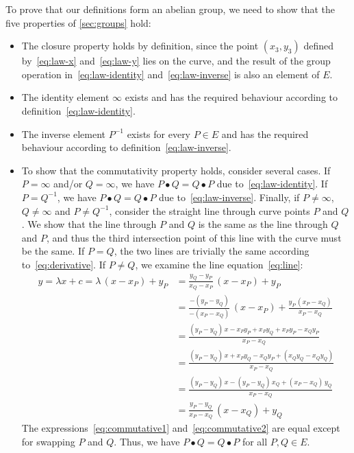\documentclass[manuscript]{acmart}
\begin{document}
To prove that our definitions form an abelian group, we need to show that the five properties of \autoref{sec:groups} hold:
\begin{itemize}
\item The closure property holds by definition, since the point $(x_3, y_3)$ defined by~\eqref{eq:law-x} and~\eqref{eq:law-y} lies on the curve, and the result of the group operation in~\eqref{eq:law-identity} and~\eqref{eq:law-inverse} is also an element of $E$.
\item The identity element $\infty$ exists and has the required behaviour according to definition~\eqref{eq:law-identity}.
\item The inverse element $P^{-1}$ exists for every $P \in E$ and has the required behaviour according to definition~\eqref{eq:law-inverse}.
\item To show that the commutativity property holds, consider several cases.
If $P = \infty$ and/or $Q = \infty$, we have $P \bullet Q = Q \bullet P$ due to~\eqref{eq:law-identity}.
If $P = Q^{-1}$, we have $P \bullet Q = Q \bullet P$ due to~\eqref{eq:law-inverse}.
Finally, if $P \neq \infty$, $Q \neq \infty$ and $P \neq Q^{-1}$, consider the straight line through curve points $P$ and $Q$.
We show that the line through $P$ and $Q$ is the same as the line through $Q$ and $P$, and thus the third intersection point of this line with the curve must be the same.
If $P=Q$, the two lines are trivially the same according to~\eqref{eq:derivative}.
If $P \neq Q$, we examine the line equation~\eqref{eq:line}:
\begin{align}
y = \lambda x + c = \lambda\,(x - x_P) + y_P &= \frac{y_Q - y_P}{x_Q - x_P}\,(x - x_P) + y_P \label{eq:commutative1}\\[5pt]
& = \frac{-(y_P - y_Q)}{-(x_P - x_Q)}\,(x - x_P) + \frac{y_P\,(x_P - x_Q)}{x_P - x_Q} \nonumber\\[5pt]
& = \frac{(y_P - y_Q)\,x - x_P y_P + x_P y_Q + x_P y_P - x_Q y_P}{x_P - x_Q} \nonumber\\[5pt]
& = \frac{(y_P - y_Q)\,x + x_P y_Q - x_Q y_P + (x_Q y_Q - x_Q y_Q)}{x_P - x_Q} \nonumber\\[5pt]
& = \frac{(y_P - y_Q)\,x - (y_P - y_Q)\,x_Q + (x_P - x_Q)\,y_Q}{x_P - x_Q} \nonumber\\[5pt]
& = \frac{y_P - y_Q}{x_P - x_Q}\,(x - x_Q) + y_Q \label{eq:commutative2}
\end{align}
The expressions~\eqref{eq:commutative1} and~\eqref{eq:commutative2} are equal except for swapping $P$ and $Q$.
Thus, we have $P \bullet Q = Q \bullet P$ for all $P, Q \in E$.
\end{itemize}
\end{document}
